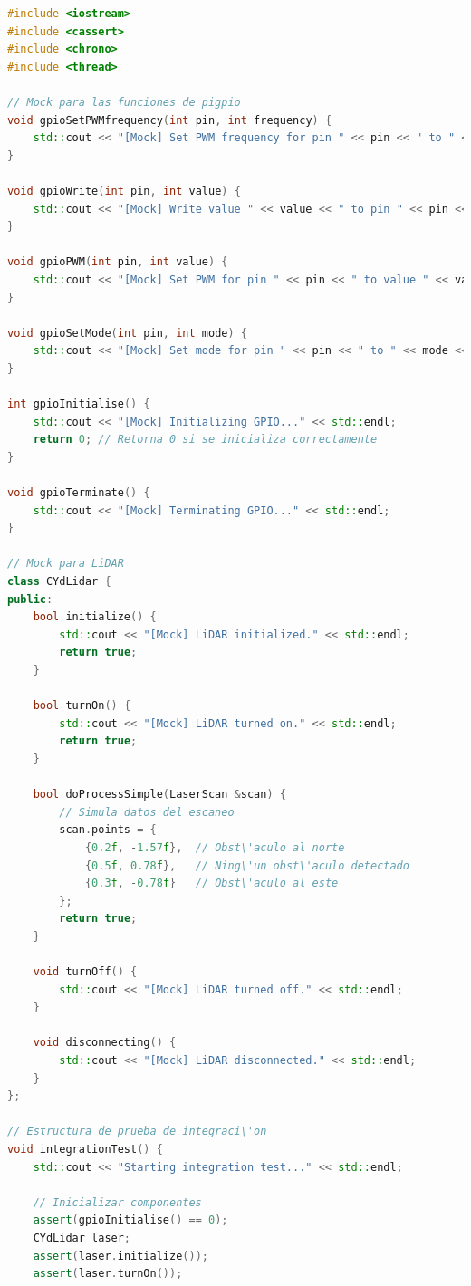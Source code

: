         \begin{lstlisting}[language={C++}, caption={main.cpp}, label={Camis}]
#include <iostream>
#include <cassert>
#include <chrono>
#include <thread>

// Mock para las funciones de pigpio
void gpioSetPWMfrequency(int pin, int frequency) {
    std::cout << "[Mock] Set PWM frequency for pin " << pin << " to " << frequency << " Hz" << std::endl;
}

void gpioWrite(int pin, int value) {
    std::cout << "[Mock] Write value " << value << " to pin " << pin << std::endl;
}

void gpioPWM(int pin, int value) {
    std::cout << "[Mock] Set PWM for pin " << pin << " to value " << value << std::endl;
}

void gpioSetMode(int pin, int mode) {
    std::cout << "[Mock] Set mode for pin " << pin << " to " << mode << std::endl;
}

int gpioInitialise() {
    std::cout << "[Mock] Initializing GPIO..." << std::endl;
    return 0; // Retorna 0 si se inicializa correctamente
}

void gpioTerminate() {
    std::cout << "[Mock] Terminating GPIO..." << std::endl;
}

// Mock para LiDAR
class CYdLidar {
public:
    bool initialize() {
        std::cout << "[Mock] LiDAR initialized." << std::endl;
        return true;
    }

    bool turnOn() {
        std::cout << "[Mock] LiDAR turned on." << std::endl;
        return true;
    }

    bool doProcessSimple(LaserScan &scan) {
        // Simula datos del escaneo
        scan.points = {
            {0.2f, -1.57f},  // Obst\'aculo al norte
            {0.5f, 0.78f},   // Ning\'un obst\'aculo detectado
            {0.3f, -0.78f}   // Obst\'aculo al este
        };
        return true;
    }

    void turnOff() {
        std::cout << "[Mock] LiDAR turned off." << std::endl;
    }

    void disconnecting() {
        std::cout << "[Mock] LiDAR disconnected." << std::endl;
    }
};

// Estructura de prueba de integraci\'on
void integrationTest() {
    std::cout << "Starting integration test..." << std::endl;

    // Inicializar componentes
    assert(gpioInitialise() == 0);
    CYdLidar laser;
    assert(laser.initialize());
    assert(laser.turnOn());


\end{lstlisting}
